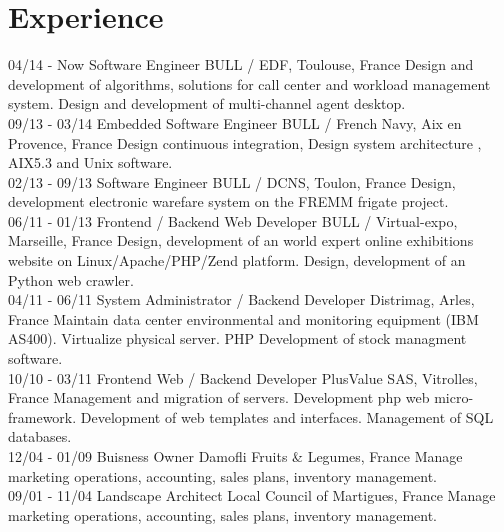 \documentclass[]{friggeri-cv}
\begin{document}
\section{Experience}
\begin{entrylist}
  \entry
    {04/14 - Now}
    {Software Engineer}
    {BULL / EDF, Toulouse, France}
    {Design and development of algorithms, solutions for call center and workload management system. Design and development of multi-channel agent desktop.\\}
  \entry
    {09/13 - 03/14}
    {Embedded Software Engineer}
    {BULL / French Navy, Aix en Provence, France}
    {Design continuous integration, Design system architecture , AIX5.3 and Unix software.\\}
    \entry
    {02/13 - 09/13}
    {Software Engineer}
    {BULL / DCNS, Toulon, France}
    {Design, development electronic warefare system on the FREMM frigate project.\\}
    \entry
    {06/11 - 01/13}
    {Frontend / Backend Web Developer}
    {BULL / Virtual-expo, Marseille, France}
    {Design, development of an world expert online exhibitions website on Linux/Apache/PHP/Zend platform. Design, development of an Python web crawler.\\}
    \entry
    {04/11 - 06/11}
    {System Administrator / Backend Developer}
    {Distrimag, Arles, France}
    {Maintain data center environmental and monitoring equipment (IBM AS400). Virtualize physical server. PHP Development of stock managment software.\\}
    \entry
    {10/10 - 03/11}
    {Frontend Web / Backend Developer}
    {PlusValue SAS, Vitrolles, France}
    {Management and migration of servers. Development php web micro-framework. Development of web templates and interfaces. Management of SQL databases.\\}
    \entry
    {12/04 - 01/09}
    {Buisness Owner}
    {Damofli Fruits \& Legumes, France}
    {Manage marketing operations, accounting, sales plans, inventory management.\\}
    \entry
    {09/01 - 11/04}
    {Landscape Architect}
    {Local Council of Martigues, France}
    {Manage marketing operations, accounting, sales plans, inventory management.}
\end{entrylist}

\newpage
\end{document}
